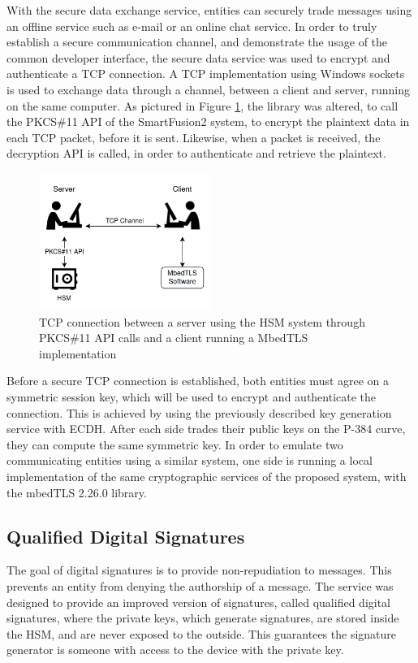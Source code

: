 With the secure data exchange service, entities can securely trade messages using an offline service such as e-mail or an online chat service.
In order to truly establish a secure communication channel, and demonstrate the usage of the common developer interface, the secure data service was used to encrypt and authenticate a TCP connection. A TCP implementation using Windows sockets is used to exchange data through a channel, between a client and server, running on the same computer. As pictured in Figure \ref{fig:implementation:tcp}, the library was altered, to call the PKCS\#11 API of the SmartFusion2 system, to encrypt the plaintext data in each TCP packet, before it is sent. Likewise, when a packet is received, the decryption API is called, in order to authenticate and retrieve the plaintext.
\begin{figure}[h!]
	\centering
	\includegraphics[width=0.5\textwidth]{./Images/tcp.png}
	\caption{TCP connection between a server using the HSM system through PKCS\#11 API calls and a client running a MbedTLS implementation}
	\label{fig:implementation:tcp}
\end{figure}
Before a secure TCP connection is established, both entities must agree on a symmetric session key, which will be used to encrypt and authenticate the connection. This is achieved by using the previously described key generation service with ECDH. After each side trades their public keys on the P-384 curve, they can compute the same symmetric key. In order to emulate two communicating entities using a similar system, one side is running a local implementation of the same cryptographic services of the proposed system, with the mbedTLS 2.26.0 library.

\subsection{Qualified Digital Signatures}\label{chap:implementation:services:signatures}

The goal of digital signatures is to provide non-repudiation to messages. This prevents an entity from denying the authorship of a message. 
The service was designed to provide an improved version of signatures, called qualified digital signatures, where the private keys, which generate signatures, are stored inside the HSM, and are never exposed to the outside.
This guarantees the signature generator is someone with access to the device with the private key.

